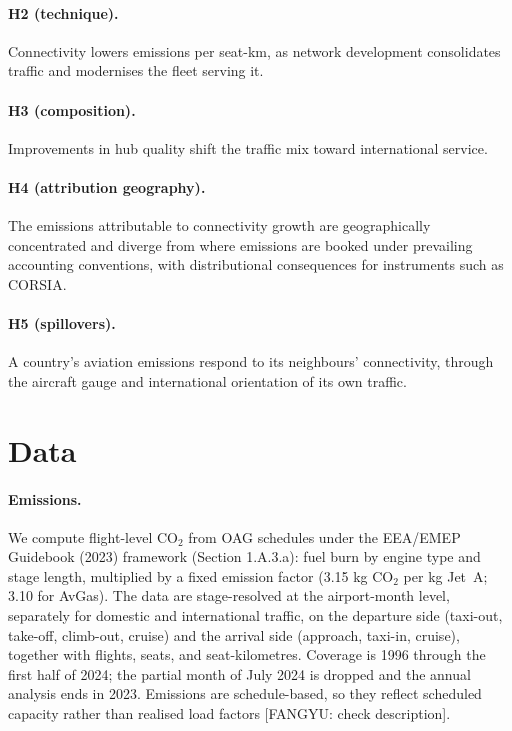 \documentclass[12pt]{article}
\begin{document}
\paragraph{H2 (technique).} Connectivity lowers emissions per seat-km, as
network development consolidates traffic and modernises the fleet serving
it.

\paragraph{H3 (composition).} Improvements in hub quality shift the traffic
mix toward international service.

\paragraph{H4 (attribution geography).} The emissions attributable to
connectivity growth are geographically concentrated and diverge from where
emissions are booked under prevailing accounting conventions, with
distributional consequences for instruments such as CORSIA.

\paragraph{H5 (spillovers).} A country's aviation emissions respond to its
neighbours' connectivity, through the aircraft gauge and international
orientation of its own traffic.

\section{Data}
\paragraph{Emissions.} We compute flight-level CO$_2$ from OAG schedules
under the EEA/EMEP Guidebook (2023) framework (Section 1.A.3.a): fuel burn
by engine type and stage length, multiplied by a fixed emission factor (3.15
kg CO$_2$ per kg Jet~A; 3.10 for AvGas). The data are stage-resolved at the
airport-month level, separately for domestic and international traffic, on
the departure side (taxi-out, take-off, climb-out, cruise) and the arrival
side (approach, taxi-in, cruise), together with flights, seats, and
seat-kilometres. Coverage is 1996 through the first half of 2024; the
partial month of July 2024 is dropped and the annual analysis ends in 2023.
Emissions are schedule-based, so they reflect scheduled capacity rather than
realised load factors [FANGYU: check description].
\end{document}
